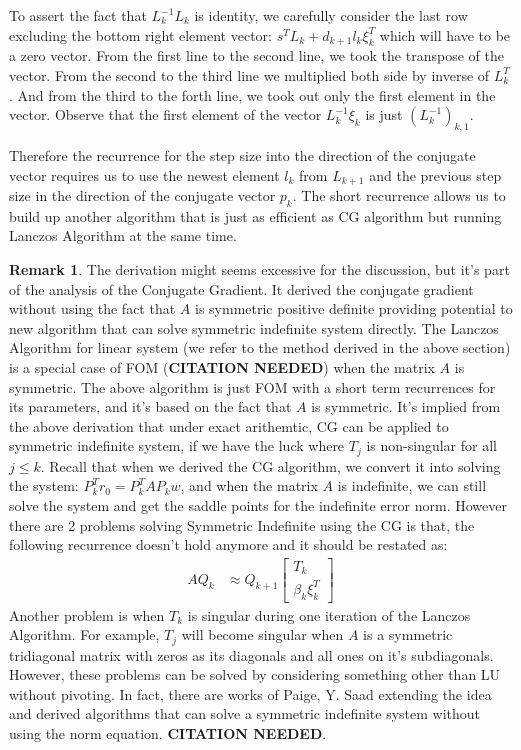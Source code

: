 \documentclass[]{article}
\theoremstyle{definition}
\newtheorem{remark}{Remark}[subsection]
\begin{document}
            To assert the fact that $L_k^{-1}L_k$ is identity, we carefully consider the last row excluding the bottom right element vector: $s^TL_k + d_{k + 1}l_k\xi_k^T$ which will have to be a zero vector. From the first line to the second line, we took the transpose of the vector. From the second to the third line we multiplied both side by inverse of $L_k^{T}$. And from the third to the forth line, we took out only the first element in the vector. Observe that the first element of the vector $L_k^{-1}\xi_k$ is just $(L_k^{-1})_{k, 1}$. 
            \par
            Therefore the recurrence for the step size into the direction of the conjugate vector requires us to use the newest element $l_k$ from $L_{k + 1}$ and the previous step size in the direction of the conjugate vector $p_k$. The short recurrence allows us to build up another algorithm that is just as efficient as CG algorithm but running Lanczos Algorithm at the same time. 
            \begin{remark}
                The derivation might seems excessive for the discussion, but it's part of the analysis of the Conjugate Gradient. It derived the conjugate gradient without using the fact that $A$ is symmetric positive definite providing potential to new algorithm that can solve symmetric indefinite system directly. The Lanczos Algorithm for linear system (we refer to the method derived in the above section) is a special case of FOM (\textbf{CITATION NEEDED}) when the matrix $A$ is symmetric. The above algorithm is just FOM with a short term recurrences for its parameters, and it's based on the fact that $A$ is symmetric. It's implied from the above derivation that under exact arithemtic, CG can be applied to symmetric indefinite system, if we have the luck where $T_j$ is non-singular for all $j\le k$. Recall that when we derived the CG algorithm, we convert it into solving the system: $P^T_kr_0 = P_k^TAP_kw$, and when the matrix $A$ is indefinite, we can still solve the system and get the saddle points for the indefinite error norm. However there are 2 problems solving Symmetric Indefinite using the CG is that, the following recurrence doesn't hold anymore and it should be restated as: 
                \begin{align}
                    AQ_k &\approx Q_{k + 1}
                    \begin{bmatrix}
                        T_k \\ \beta_k \xi_k^T
                    \end{bmatrix}
                \end{align}
                Another problem is when $T_k$ is singular during one iteration of the Lanczos Algorithm. For example, $T_j$ will become singular when $A$ is a symmetric tridiagonal matrix with zeros as its diagonals and all ones on it's subdiagonals. However, these problems can be solved by considering something other than LU without pivoting. In fact, there are works of Paige, Y. Saad extending the idea and derived algorithms that can solve a symmetric indefinite system without using the norm equation. 
                \textbf{CITATION NEEDED}. 
            \end{remark}
        
\end{document}
